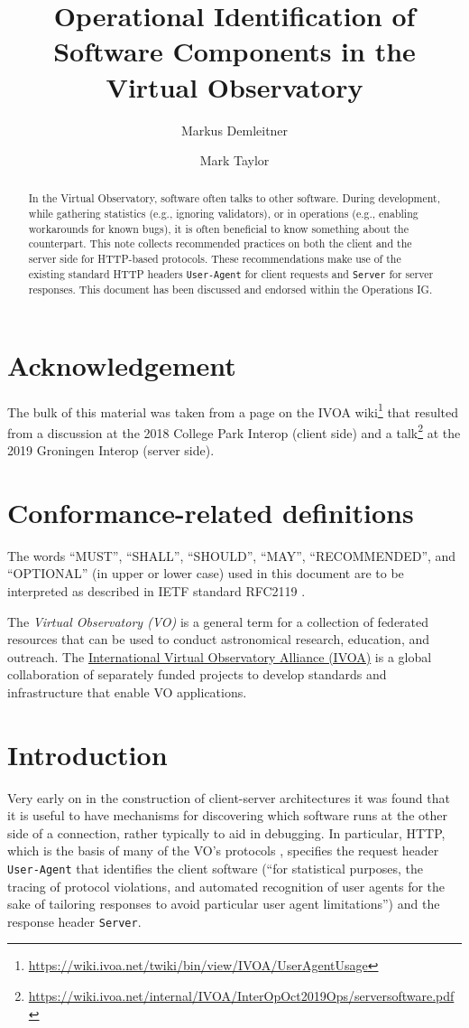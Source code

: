 \documentclass[11pt,a4paper]{ivoa}
\title{Operational Identification of Software Components in the Virtual
Observatory}
\author[https://wiki.ivoa.net/twiki/bin/view/IVOA/WebHome?topic=MarkusDemleitner]{Markus
Demleitner}
\author[https://wiki.ivoa.net/twiki/bin/view/IVOA/MarkusDemleitner?topic=MarkTaylor]{Mark
Taylor}
\newcommand{\headername}[1]{{\tt #1}}
\begin{document}
\begin{abstract}
In the Virtual Observatory, software often talks to other software.
During development, while gathering statistics (e.g., ignoring
validators), or in operations (e.g., enabling workarounds for known
bugs), it is often beneficial to know something about the
counterpart.  This note collects recommended practices on both the
client and the server side for HTTP-based protocols.
These recommendations make use of the existing standard HTTP headers
\headername{User-Agent} for client requests and
\headername{Server} for server responses.  This document has been
discussed and endorsed within the Operations IG.
\end{abstract}

\section*{Acknowledgement}

The bulk of this material was taken from a page on the IVOA
wiki\footnote{\url{https://wiki.ivoa.net/twiki/bin/view/IVOA/UserAgentUsage}}
that resulted from a discussion at the 2018 College Park Interop (client
side) and a
talk\footnote{\url{https://wiki.ivoa.net/internal/IVOA/InterOpOct2019Ops/serversoftware.pdf}}
at the 2019 Groningen Interop (server side).


\section*{Conformance-related definitions}

The words ``MUST'', ``SHALL'', ``SHOULD'', ``MAY'', ``RECOMMENDED'', and
``OPTIONAL'' (in upper or lower case) used in this document are to be
interpreted as described in IETF standard RFC2119 \citep{std:RFC2119}.

The \emph{Virtual Observatory (VO)} is a
general term for a collection of federated resources that can be used
to conduct astronomical research, education, and outreach.
The \href{http://www.ivoa.net}{International
Virtual Observatory Alliance (IVOA)} is a global
collaboration of separately funded projects to develop standards and
infrastructure that enable VO applications.


\section{Introduction}

Very early on in the construction of client-server architectures it was
found that it is useful to have mechanisms for
discovering which software runs
at the other side of a connection, rather typically to aid in debugging.
In particular, HTTP, which is the basis of many of the VO's protocols
\citep{std:HTTP}, specifies the request header \headername{User-Agent} that
identifies the client software (``for statistical purposes, the tracing
of protocol violations, and automated recognition of user agents for the
sake of tailoring responses to avoid particular user agent
limitations'') and the response header \headername{Server}.
\end{document}

